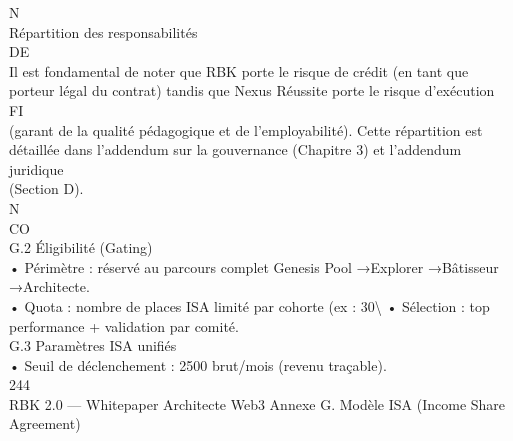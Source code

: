 \vspace{0.5em}
\vspace{0.5em}
\vspace{0.5em}
N\\
Répartition des responsabilités\\
\vspace{0.5em}
\vspace{0.5em}
\vspace{0.5em}
\vspace{0.5em}
DE\\
Il est fondamental de noter que RBK porte le risque de crédit (en tant que porteur légal du contrat) tandis que Nexus Réussite porte le risque d’exécution\\
\vspace{0.5em}
\vspace{0.5em}
\vspace{0.5em}
\vspace{0.5em}
FI\\
(garant de la qualité pédagogique et de l’employabilité). Cette répartition est détaillée dans l’addendum sur la gouvernance (Chapitre 3) et l’addendum juridique\\
(Section D).\\
\vspace{0.5em}
\vspace{0.5em}
N\\
CO\\
G.2 Éligibilité (Gating)\\
• Périmètre : réservé au parcours complet Genesis Pool →Explorer →Bâtisseur →Architecte.\\
\vspace{0.5em}
• Quota : nombre de places ISA limité par cohorte (ex : 30\textbackslash{}%
\vspace{0.5em}
• Sélection : top performance + validation par comité.\\
\vspace{0.5em}
\vspace{0.5em}
\vspace{0.5em}
G.3 Paramètres ISA unifiés\\
• Seuil de déclenchement : 2500 brut/mois (revenu traçable).\\
\vspace{0.5em}
\vspace{0.5em}
\vspace{0.5em}
244\\
RBK 2.0 — Whitepaper Architecte Web3                                                                         Annexe G. Modèle ISA (Income Share Agreement)\\
